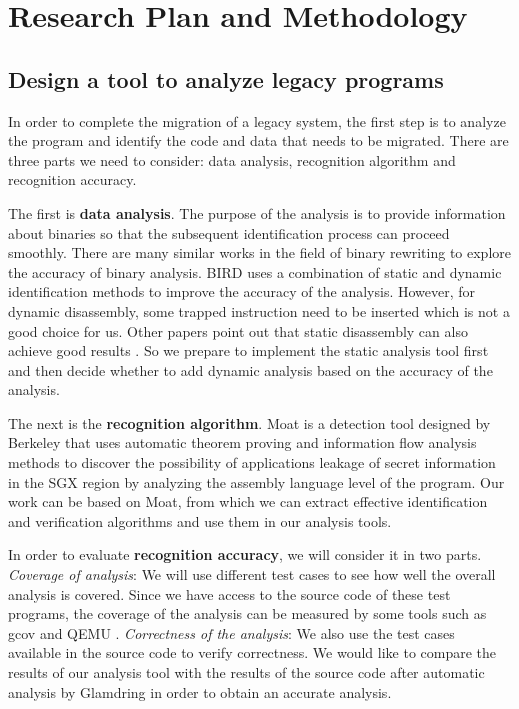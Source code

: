 \section{Research Plan and Methodology}
\subsection{Design a tool to analyze legacy programs}
In order to complete the migration of a legacy system, the first step is
to analyze the program and identify the code and data that needs to be migrated.
There are three parts we need to consider: data analysis, recognition algorithm
and recognition accuracy.

The first is \textbf{data analysis}. The purpose of the analysis is to provide
information about binaries so that the subsequent identification process can
proceed smoothly.
There are many similar works in the field of binary rewriting to explore
the accuracy of binary analysis.
BIRD \cite{Nanda2006BIRDBI} uses a combination of static and dynamic identification
methods to improve the accuracy of the analysis. However, for dynamic disassembly,
some trapped instruction need to be inserted which is not a good choice for us.
Other papers point out that static disassembly can also achieve good results
\cite{Andriesse2016AnIA}. So we prepare to implement the static analysis tool first
and then decide whether to add dynamic analysis based on the accuracy of the analysis.

The next is the \textbf{recognition algorithm}.
Moat \cite{Sinha2015MoatVC} is a detection tool designed by Berkeley that uses
automatic theorem proving and information flow analysis methods to discover the
possibility of applications leakage of secret information in the SGX region by
analyzing the assembly language level of the program.
Our work can be based on Moat, from which we can extract effective identification
and verification algorithms and use them in our analysis tools. 

In order to evaluate \textbf{recognition accuracy}, we will consider it in two parts.
\textit{Coverage of analysis}:
We will use different test cases to see how well the overall analysis is covered.
Since we have access to the source code of these test programs,
the coverage of the analysis can be measured by some tools such as gcov \cite{GCOV}
and QEMU \cite{Bellard2005QEMUAF}.
\textit{Correctness of the analysis}:
We also use the test cases available in the source code to verify correctness.
We would like to compare the results of our analysis tool with the results of the source code
after automatic analysis by Glamdring \cite{Lind2017GlamdringAA} in order to obtain
an accurate analysis.

